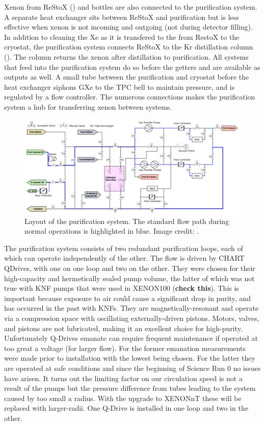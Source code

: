 Xenon from ReStoX  () and bottles are also connected to the purification system.  A separate heat exchanger
sits between ReStoX and purification but is less effective when xenon is not incoming and outgoing (not during detector filling).  In
addition to cleaning the Xe as it is transfered to the from RestoX to the cryostat, the purification system connects ReStoX to the Kr
distillation column ().  The column returns the xenon after distillation to purification.  All systems that
feed into the purification system do so before the getters and are available as outputs as well.  A small tube between the purification
and cryostat before the heat exchanger siphons GXe to the TPC bell to maintain pressure, and is regulated by a flow controller.  The
numerous connections makes the purification system a hub for transferring xenon between systems.

\begin{figure}
\centering
\includegraphics[width=\textwidth]{PurificationLayout}
\caption{Layout of the purification system.  The standard flow path during normal operations is highlighted in blue.  Image credit:
.}
\label{fig:xenon1t_pur_schematic}
\end{figure}

The purification system consists of two redundant purification loops, each of which can operate independently of the other.  The flow
is driven by CHART QDrives, with one on one loop and two on the other.  They were chosen for their high-capacity and hermetically sealed
pump volume, the latter of which was not true with KNF pumps that were used in XENON100 (\textbf{check this}).  This is important because
exposure to air could cause a significant drop in purity, and has occurred in the past with KNFs.  They are
magnetically-resonant and operate via a compression space with oscillating externally-driven pistons.  Motors, valves, and pistons are
not lubricated, making it an excellent choice for high-purity.  Unfortunately Q-Drives emanate  can require frequent
maintenance if operated at too great a voltage (for larger flow).  For the former  emanation measurements were made prior to
installation with the lowest being chosen.  For the latter they are operated at safe conditions and since the beginning of Science Run 0
no issues have arisen.  It turns out the limiting factor on our circulation speed is not a result of the pumps but the pressure difference
from tubes leading to the system caused by too small a radius.  With the upgrade to XENONnT these will be replaced with larger-radii.  One
Q-Drive is installed in one loop and two in the other.

